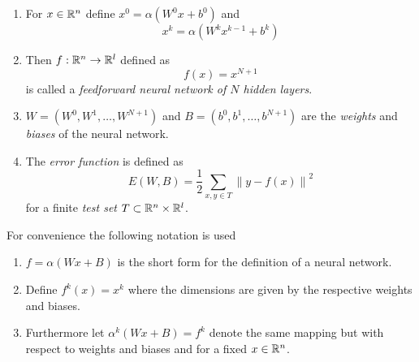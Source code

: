 \begin{definition}
    \hfill
    \begin{enumerate}
        \item For \( x \in \mathbb{R}^n \) define \( x^0 = \alpha(W^0x + b^0) \) and
              \[
                  x^k = \alpha(W^k x^{k - 1} + b^k)
              \]
        \item Then \( f: \mathbb{R}^n \to \mathbb{R}^l \) defined as
              \[
                  f(x) = x^{N + 1}
              \]
              is called a \emph{feedforward neural network of \( N \) hidden layers}.
        \item \( W = (W^0, W^1, \dots, W^{N + 1} ) \) and \( B = (b^0, b^1, \dots, b^{N + 1}) \)
              are the \emph{weights} and \emph{biases} of the neural network.
        \item The \emph{error function}
              is defined as
              \[
                  E(W, B) = \frac{1}{2} \sum_{x, y \in T} {\| y - f(x) \|}^2
              \]
              for a finite \emph{test set} \( T \subset \mathbb{R}^n \times \mathbb{R}^{l} \).
    \end{enumerate}
\end{definition}
\bigskip


For convenience the following notation is used
\begin{enumerate}
    \item \( f = \alpha(Wx + B) \) is the short form for the definition of a neural network.
    \item Define \( f^k(x) = x^k \) where the dimensions are given by the respective weights and biases.
    \item Furthermore let \( \alpha^k(Wx + B) = f^k\) denote the same mapping but with respect to weights 
          and biases and for a fixed \( x \in \mathbb{R}^n \).
\end{enumerate}
\bigskip

